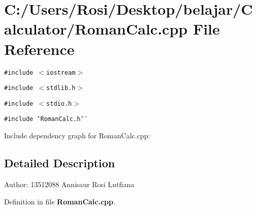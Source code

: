 \section{C:/Users/Rosi/Desktop/belajar/Calculator/Roman\-Calc.cpp File Reference}
\label{_roman_calc_8cpp}
{\tt \#include $<$iostream$>$}\par
{\tt \#include $<$stdlib.h$>$}\par
{\tt \#include $<$stdio.h$>$}\par
{\tt \#include \char`\"{}Roman\-Calc.h\char`\"{}}\par


Include dependency graph for Roman\-Calc.cpp:

\subsection{Detailed Description}
\begin{Desc}
\item[Author:]13512088 Annisaur Rosi Lutfiana \end{Desc}


Definition in file {\bf Roman\-Calc.cpp}.